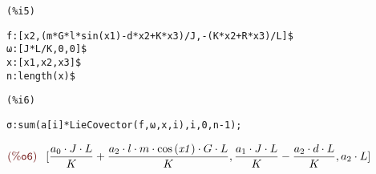 \noindent
\begin{minipage}[t]{8ex}\color{red}\bf
\begin{verbatim}
(%i5) 
\end{verbatim}
\end{minipage}
\begin{minipage}[t]{\textwidth}\color{blue}
\begin{verbatim}
f:[x2,(m*G*l*sin(x1)-d*x2+K*x3)/J,-(K*x2+R*x3)/L]$
ω:[J*L/K,0,0]$
x:[x1,x2,x3]$
n:length(x)$
\end{verbatim}
\end{minipage}

\smallskip

\noindent
\begin{minipage}[t]{8ex}\color{red}\bf
\begin{verbatim}
(%i6) 
\end{verbatim}
\end{minipage}
\begin{minipage}[t]{\textwidth}\color{blue}
\begin{verbatim}
σ:sum(a[i]*LieCovector(f,ω,x,i),i,0,n-1);
\end{verbatim}
\end{minipage}

\noindent
$\displaystyle
\parbox{8ex}{$\color{labelcolor}\mathrm{\tt (\%o6) }\quad $}
[\frac{{{a}_{0}}\cdot J\cdot L}{K}+\frac{{{a}_{2}}\cdot l\cdot m\cdot \mathrm{cos}\left( \mathit{x1}\right) \cdot G\cdot L}{K},\frac{{{a}_{1}}\cdot J\cdot L}{K}-\frac{{{a}_{2}}\cdot d\cdot L}{K},{{a}_{2}}\cdot L]\mbox{}
$

